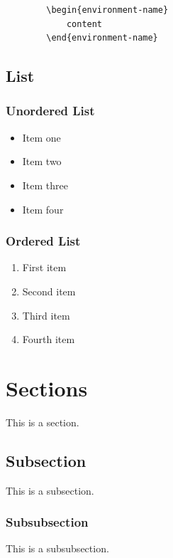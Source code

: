 	\begin{verbatim}
		\begin{environment-name}
			content
		\end{environment-name}
	\end{verbatim}
	
	\subsection{List}
	
		\subsubsection*{Unordered List}
		
		\begin{itemize}
			\item Item one
			\item Item two
			\item Item three
			\item Item four
		\end{itemize}
	
		\subsubsection*{Ordered List}
		
		\begin{enumerate}
			\item First item
			\item Second item
			\item Third item
			\item Fourth item
		\end{enumerate}
	
\section{Sections}

	This is a section.

	\subsection{Subsection}
	
		This is a subsection.
	
	\subsubsection{Subsubsection}
	
		This is a subsubsection.
	
